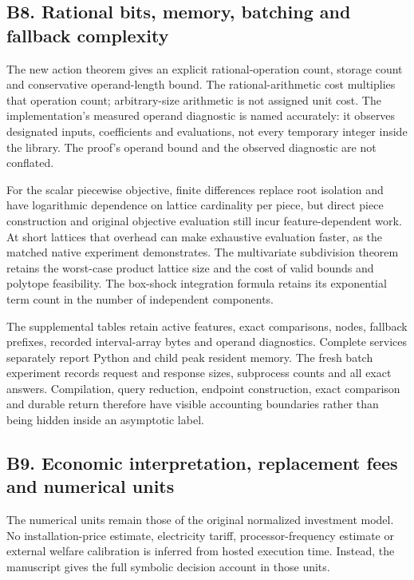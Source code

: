 \documentclass[ecta,nameyear,draft]{econsocart}
\begin{document}
\hypertarget{b8.-rational-bits-memory-batching-and-fallback-complexity}{%
\subsection{B8. Rational bits, memory, batching and fallback
complexity}\label{b8.-rational-bits-memory-batching-and-fallback-complexity}}

The new action theorem gives an explicit rational-operation count,
storage count and conservative operand-length bound. The
rational-arithmetic cost multiplies that operation count; arbitrary-size
arithmetic is not assigned unit cost. The implementation's measured
operand diagnostic is named accurately: it observes designated inputs,
coefficients and evaluations, not every temporary integer inside the
library. The proof's operand bound and the observed diagnostic are not
conflated.

For the scalar piecewise objective, finite differences replace root
isolation and have logarithmic dependence on lattice cardinality per
piece, but direct piece construction and original objective evaluation
still incur feature-dependent work. At short lattices that overhead can
make exhaustive evaluation faster, as the matched native experiment
demonstrates. The multivariate subdivision theorem retains the
worst-case product lattice size and the cost of valid bounds and
polytope feasibility. The box-shock integration formula retains its
exponential term count in the number of independent components.

The supplemental tables retain active features, exact comparisons,
nodes, fallback prefixes, recorded interval-array bytes and operand
diagnostics. Complete services separately report Python and child peak
resident memory. The fresh batch experiment records request and response
sizes, subprocess counts and all exact answers. Compilation, query
reduction, endpoint construction, exact comparison and durable return
therefore have visible accounting boundaries rather than being hidden
inside an asymptotic label.

\hypertarget{b9.-economic-interpretation-replacement-fees-and-numerical-units}{%
\subsection{B9. Economic interpretation, replacement fees and numerical
units}\label{b9.-economic-interpretation-replacement-fees-and-numerical-units}}

The numerical units remain those of the original normalized investment
model. No installation-price estimate, electricity tariff,
processor-frequency estimate or external welfare calibration is inferred
from hosted execution time. Instead, the manuscript gives the full
symbolic decision account in those units.
\end{document}
